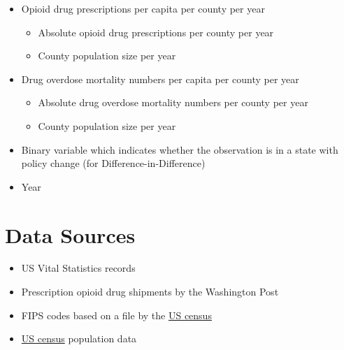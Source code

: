 \documentclass[12pt]{article}
\begin{document}
\begin{itemize}

\item Opioid drug prescriptions per capita per county per year
	\begin{itemize}
	\item Absolute opioid drug prescriptions per county per year
	\item County population size per year
	\end{itemize}
\item Drug overdose mortality numbers per capita per county per year
	\begin{itemize}
	\item Absolute drug overdose mortality numbers per county per year
	\item County population size per year
	\end{itemize}
\item Binary variable which indicates whether the observation is in a state with policy change (for Difference-in-Difference)

\item Year



\end{itemize}

\section{Data Sources}



\begin{itemize}
	\item US Vital Statistics records
	\item Prescription opioid drug shipments by the Washington Post
	\item FIPS codes based on a file by the \href{https://www2.census.gov/geo/docs/reference/codes/files/national_county.txt}{US census}
	\item \href{https://www.census.gov/programs-surveys/popest/data.html}{US census} population data
\end{itemize}
\end{document}
